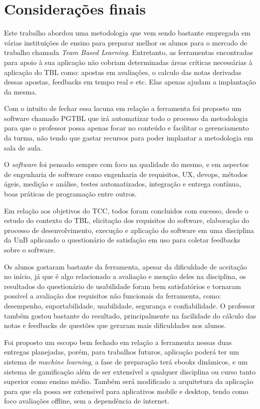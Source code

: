 \chapter{Considerações finais}

Este trabalho abordou uma metodologia que vem sendo bastante empregada em várias instituições de ensino para preparar melhor os alunos para o mercado de trabalho chamada \textit{Team Based Learning}. Entretanto, as ferramentas encontradas para apoio à sua aplicação não cobriam determinadas áreas críticas necessárias à aplicação do TBL como: apostas em avaliaçôes, o calculo das notas derivadas dessas apostas, feedbacks em tempo real e etc. Elas apenas ajudam a implantação da mesma.

Com o intuito de fechar essa lacuna em relação a ferramenta foi proposto um software chamado PGTBL que irá automatizar todo o processo da metodologia para que o professor possa apenas focar no conteúdo e facilitar o gerenciamento da turma, não tendo que gastar recursos para poder implantar a metodologia em sala de aula.

O \textit{software} foi pensado sempre com foco na qualidade do mesmo, e em aspectos de engenharia de software como engenharia de requisitos, UX, devops, métodos ágeis, medição e análise, testes automatizados, integração e entrega contínua, boas práticas de programação entre outros.

Em relação aos objetivos do TCC, todos foram concluidos com sucesso, desde o estudo do contexto do TBL, elicitação dos
requisitos do software, elaboração do processo de desenvolvimento, execução e aplicação do software em uma disciplina da
UnB aplicando o questionário de satisfação em uso para coletar feedbacks sobre o software.

Os alunos gostaram bastante da ferramenta, apesar da dificuldade de aceitação no início, já que é algo relacionado a
avaliação e menção deles na disciplina, os resultados do questionário de usabilidade foram bem satisfatórios e tornaram
possível a avaliação dos requisitos não funcionais da ferramenta, como: desempenho, suportabilidade, usabilidade,
segurança e confiabilidade. O professor também gostou bastante do resultado, principalmente na facilidade do cálculo das
notas e feedbacks de questões que geraram mais dificuldades nos alunos.

Foi proposto um escopo bem fechado em relação a ferramenta nessas duas entregas planejadas, porém, para trabalhos
futuros, aplicação poderá ter um sistema de \textit{machine learning}, a fase de preparação terá ebooks dinâmicos, e um
sistema de gamificação além de ser extensível a qualquer disciplina ou curso tanto superior como ensino médio.
Também será modificado a arquitetura da aplicação para que ela possa ser extensivel para aplicativos mobile e desktop,
tendo como foco avaliações offline, sem a dependência de internet.
